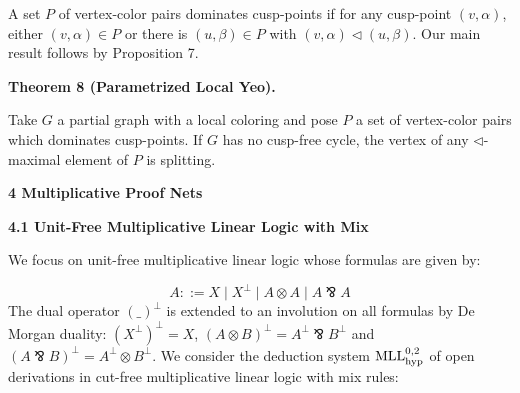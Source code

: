  
 
A set $P$ of vertex-color pairs dominates cusp-points if for any cusp-point $(v,\alpha)$, either $(v,\alpha)\in P$ or there is $(u,\beta)\in P$ with $(v,\alpha)\lhd(u,\beta)$. Our main result follows by Proposition 7.\par
 
 
 
\par\medskip\noindent\textbf{Theorem 8 (Parametrized Local Yeo).}\par
 
 
Take $G$ a partial graph with a local coloring and pose $P$ a set of vertex-color pairs which dominates cusp-points. If $G$ has no cusp-free cycle, the vertex of any $\lhd$-maximal element of $P$ is splitting.\par
 
 
 
 


 
\par\medskip\noindent\textbf{4 Multiplicative Proof Nets}\par
 
 
\par\medskip\noindent\textbf{4.1 Unit-Free Multiplicative Linear Logic with Mix}\par
 
 
We focus on unit-free multiplicative linear logic whose formulas are given by:\par
    \[A::=X\mid X^{\perp}\mid A\otimes A\mid A\invamp A\]    
The dual operator $(\_)^{\perp}$ is extended to an involution on all formulas by De Morgan duality: $(X^{\perp})^{\perp}=X$, $(A\otimes B)^{\perp}=A^{\perp}\invamp B^{\perp}$ and $(A\invamp B)^{\perp}=A^{\perp}\otimes B^{\perp}$. We consider the deduction system $\textnormal{{MLL}}^{0,2}_{\textnormal{{hyp}}}$ of open derivations in cut-free multiplicative linear logic with mix rules:\par
 
 
